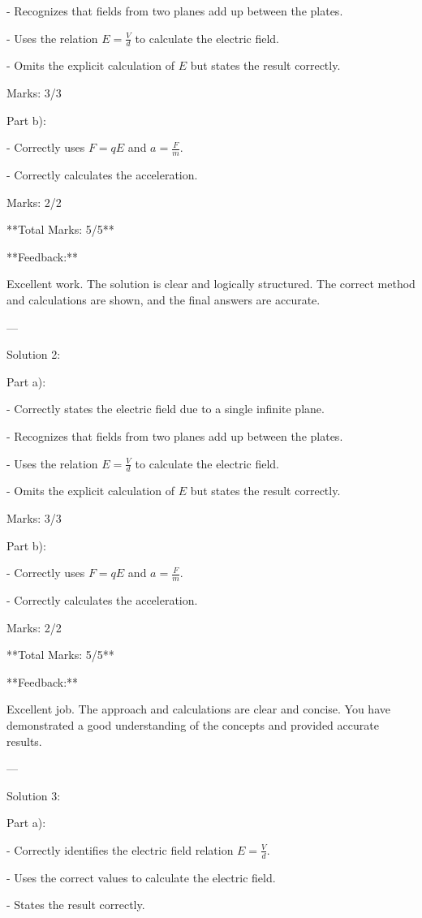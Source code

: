 \documentclass[a4paper,11pt]{article}
\begin{document}
- Recognizes that fields from two planes add up between the plates.

- Uses the relation \( E = \frac{V}{d} \) to calculate the electric field.

- Omits the explicit calculation of \( E \) but states the result correctly.

Marks: 3/3

Part b):

- Correctly uses \( F = qE \) and \( a = \frac{F}{m} \).

- Correctly calculates the acceleration.

Marks: 2/2

**Total Marks: 5/5**

**Feedback:**

Excellent work. The solution is clear and logically structured. The correct method and calculations are shown, and the final answers are accurate.

---

Solution 2:

Part a):

- Correctly states the electric field due to a single infinite plane.

- Recognizes that fields from two planes add up between the plates.

- Uses the relation \( E = \frac{V}{d} \) to calculate the electric field.

- Omits the explicit calculation of \( E \) but states the result correctly.

Marks: 3/3

Part b):

- Correctly uses \( F = qE \) and \( a = \frac{F}{m} \).

- Correctly calculates the acceleration.

Marks: 2/2

**Total Marks: 5/5**

**Feedback:**

Excellent job. The approach and calculations are clear and concise. You have demonstrated a good understanding of the concepts and provided accurate results.

---

Solution 3:

Part a):

- Correctly identifies the electric field relation \( E = \frac{V}{d} \).

- Uses the correct values to calculate the electric field.

- States the result correctly.
\end{document}
